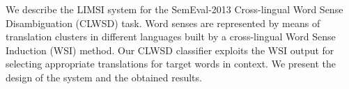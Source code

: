 We describe the LIMSI system for the SemEval-2013 Cross-lingual Word Sense Disambiguation (CLWSD) task. Word senses are represented by means of
 translation clusters in different languages built by a cross-lingual Word Sense
 Induction (WSI) method. Our CLWSD classifier exploits the WSI output for
 selecting appropriate translations for target words in context. We present the
 design of the system and the obtained results.

